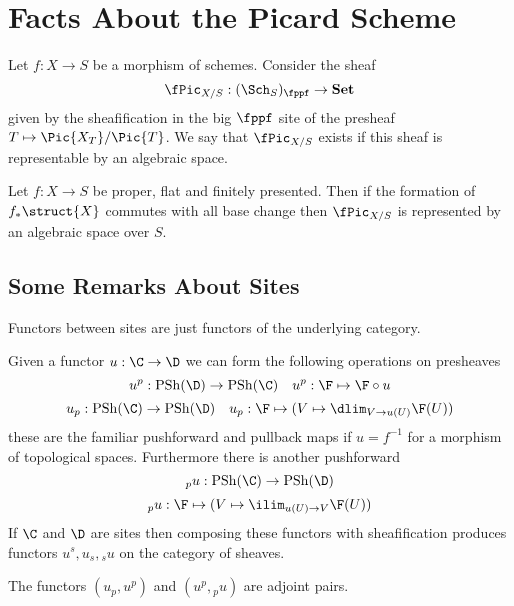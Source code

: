 \documentclass[12pt]{article}
\begin{document}
\section{Facts About the Picard Scheme}

\tableofcontents

\newcommand{\Set}{\mathbf{Set}}

\begin{defn}
Let $f : X \to S$ be a morphism of schemes. Consider the sheaf
\[ \fPic_{X/S} : (\Sch_S)_{\fppf} \to \Set \]
given by the sheafification in the big $\fppf$ site of the presheaf $T \mapsto \Pic{X_T} / \Pic{T}$. We say that $\fPic_{X/S}$ exists if this sheaf is representable by an algebraic space. 
\end{defn}

\begin{theorem}[Artin]
Let $f : X \to S$ be proper, flat and finitely presented. Then if the formation of $f_* \struct{X}$ commutes with all base change then $\fPic_{X/S}$ is represented by an algebraic space over $S$.
\end{theorem}

\subsection{Some Remarks About Sites}

\renewcommand{\Sh}{\mathrm{Sh}}
\newcommand{\PSh}{\mathrm{PSh}}

Functors between sites are just functors of the underlying category.

\begin{defn}
Given a functor $u : \C \to \D$ we can form the following operations on presheaves
\[ u^p : \PSh(\D) \to \PSh(\C) \quad u^p : \F \mapsto \F \circ u \]
\[ u_p : \PSh(\C) \to \PSh(\D) \quad u_p : \F \mapsto (V \mapsto \dlim_{V \to u(U)} \F(U)) \]
these are the familiar pushforward and pullback maps if $u = f^{-1}$ for a morphism of topological spaces. Furthermore there is another pushforward
\[ {}_p u : \PSh(\C) \to \PSh(\D) \]
\[ {}_p u : \F \mapsto (V \mapsto \ilim_{u(U) \to V} \F(U)) \]
If $\C$ and $\D$ are sites then composing these functors with sheafification produces functors $u^s, u_s, {}_s u$ on the category of sheaves.
\end{defn}

\begin{lemma}
The functors $(u_p, u^p)$ and $(u^p, {}_p u)$ are adjoint pairs.
\end{lemma}
\end{document}
